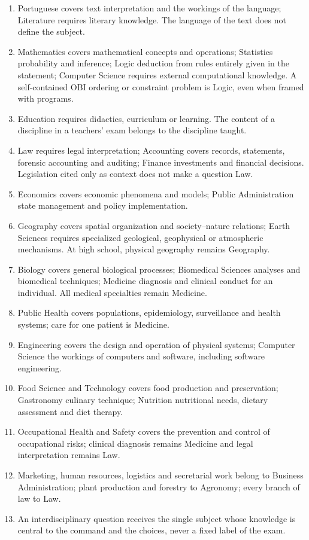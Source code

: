 \begin{enumerate}\setlength{\itemsep}{0pt}
\item Portuguese covers text interpretation and the workings of the
language; Literature requires literary knowledge. The language of the text
does not define the subject.
\item Mathematics covers mathematical concepts and operations; Statistics
probability and inference; Logic deduction from rules entirely given in the
statement; Computer Science requires external computational knowledge. A
self-contained OBI ordering or constraint problem is Logic, even when framed
with programs.
\item Education requires didactics, curriculum or learning. The content of a
discipline in a teachers' exam belongs to the discipline taught.
\item Law requires legal interpretation; Accounting covers records,
statements, forensic accounting and auditing; Finance investments and
financial decisions. Legislation cited only as context does not make a
question Law.
\item Economics covers economic phenomena and models; Public Administration
state management and policy implementation.
\item Geography covers spatial organization and society--nature relations;
Earth Sciences requires specialized geological, geophysical or atmospheric
mechanisms. At high school, physical geography remains Geography.
\item Biology covers general biological processes; Biomedical Sciences
analyses and biomedical techniques; Medicine diagnosis and clinical conduct
for an individual. All medical specialties remain Medicine.
\item Public Health covers populations, epidemiology, surveillance and health
systems; care for one patient is Medicine.
\item Engineering covers the design and operation of physical systems;
Computer Science the workings of computers and software, including software
engineering.
\item Food Science and Technology covers food production and preservation;
Gastronomy culinary technique; Nutrition nutritional needs, dietary
assessment and diet therapy.
\item Occupational Health and Safety covers the prevention and control of
occupational risks; clinical diagnosis remains Medicine and legal
interpretation remains Law.
\item Marketing, human resources, logistics and secretarial work belong to
Business Administration; plant production and forestry to Agronomy; every
branch of law to Law.
\item An interdisciplinary question receives the single subject whose
knowledge is central to the command and the choices, never a fixed label of
the exam.
\end{enumerate}

